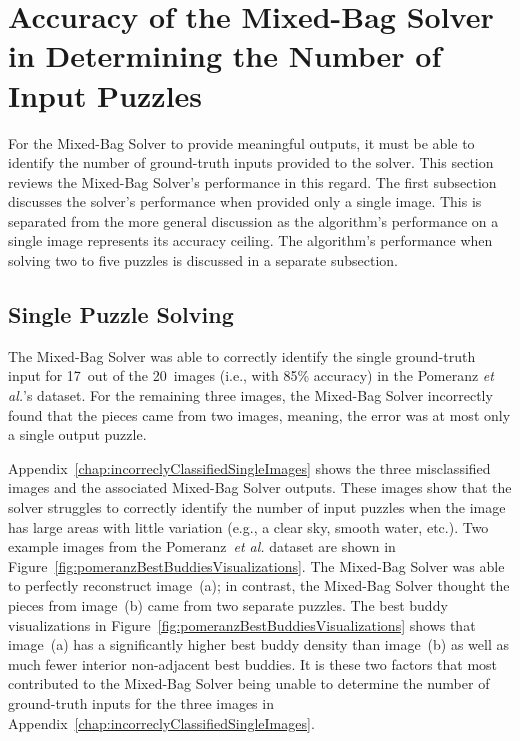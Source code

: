 \section{Accuracy of the Mixed-Bag Solver in Determining the Number of Input Puzzles}

For the Mixed-Bag Solver to provide meaningful outputs, it must be able to identify the number of ground-truth inputs provided to the solver.  This section reviews the Mixed-Bag Solver's performance in this regard.  The first subsection discusses the solver's performance when provided only a single image.  This is separated from the more general discussion as the algorithm's performance on a single image represents its accuracy ceiling.  The algorithm's performance when solving two to five puzzles is discussed in a separate subsection.

\subsection{Single Puzzle Solving}\label{sec:singlePuzzleSolving}

The Mixed-Bag Solver was able to correctly identify the single ground-truth input for 17~out of the 20~images (i.e., with 85\% accuracy) in the Pomeranz \textit{et al.}'s dataset.  For the remaining three images, the Mixed-Bag Solver incorrectly found that the pieces came from two images, meaning, the error was at most only a single output puzzle. 

Appendix~\ref{chap:incorreclyClassifiedSingleImages} shows the three misclassified images and the associated Mixed-Bag Solver outputs. These images show that the solver struggles to correctly identify the number of input puzzles when the image has large areas with little variation (e.g., a clear sky, smooth water, etc.). Two example images from the Pomeranz~\textit{et al.} dataset are shown in Figure~\ref{fig:pomeranzBestBuddiesVisualizations}.  The Mixed-Bag Solver was able to perfectly reconstruct image~(a); in contrast, the Mixed-Bag Solver thought the pieces from image~(b) came from two separate puzzles. The best buddy visualizations in Figure~\ref{fig:pomeranzBestBuddiesVisualizations} shows that image~(a) has a significantly higher best buddy density than image~(b) as well as much fewer interior non-adjacent best buddies.  It is these two factors that most contributed to the Mixed-Bag Solver being unable to determine the number of ground-truth inputs for the three images in Appendix~\ref{chap:incorreclyClassifiedSingleImages}. 

